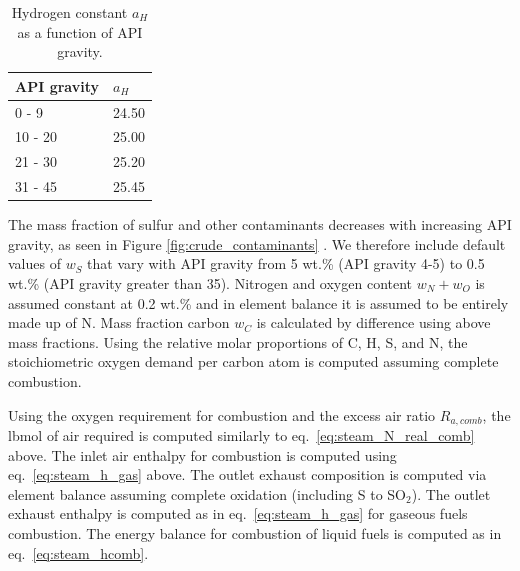 \documentclass[11pt]{report}
\newcommand{\marg}[1]{{\footnotesize\textit{\textcolor{stanford}{'#1'}}}}
\newcommand{\marginnote}[1]{\marginpar{\marg{#1}}}
\begin{document}
\begin{table}
\caption{Hydrogen constant $a_H$ as a function of API gravity.}
\label{tab:hydrogen_const}
\begin{scriptsize}
\begin{tabular*}{0.5\columnwidth}{p{}p{}}
\toprule
API gravity & $a_H$ \\
\midrule
0 - 9 & 24.50\\
10 - 20 & 25.00\\
21 - 30 & 25.20 \\
31 - 45 & 25.45 \\
\bottomrule
\end{tabular*}
\end{scriptsize}
\end{table}


The mass fraction of \marginnote{Fuel Specs \\ Table 1.2} sulfur and other contaminants decreases with increasing API gravity, as seen in Figure \ref{fig:crude_contaminants} \cite[Ch. 8, tables 3, 4]{speight1994} \cite[Ch. 7, tables 2, 3, and 19]{speight1994} \cite{swafford2009}. We therefore include default values of $w_S$ that vary with API gravity from 5 wt.\% (API gravity 4-5) to 0.5 wt.\% (API gravity greater than 35). Nitrogen and oxygen content $w_N + w_O$ is assumed constant at 0.2 wt.\% and in element balance it is assumed to be entirely made up of N. Mass fraction carbon $w_C$ is calculated by difference using above mass fractions. Using the relative molar proportions of C, H, S, and N, the stoichiometric oxygen demand per carbon atom is computed assuming complete combustion. 

Using the oxygen requirement for combustion and the excess air ratio \marginnote{Steam Generation 2.2.3}$R_{a,comb}$, the lbmol of air required is computed similarly to eq.\ \eqref{eq:steam_N_real_comb} above. The inlet air enthalpy for combustion is computed using eq.\ \eqref{eq:steam_h_gas} above. The outlet exhaust composition is computed via element balance assuming complete oxidation (including S to SO$_2$). The outlet exhaust enthalpy is computed as in eq.\ \eqref{eq:steam_h_gas} for gaseous fuels combustion. The energy balance for combustion of liquid fuels is computed as in eq.\ \eqref{eq:steam_hcomb}.
\end{document}
